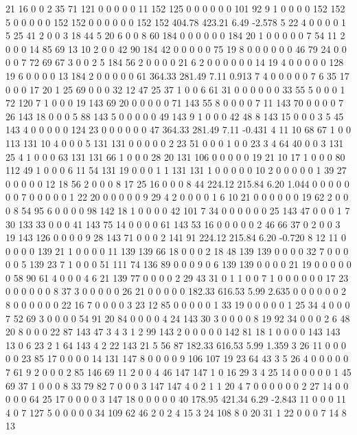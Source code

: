  21 16 0 0 2 35 71 121 0 0 0 0 0 11 152 125 0 0 0 0
 0 0 101 92 9 1 0 0 0 0 152 152 5 0 0 0 0 0 152 152
 0 0 0 0 0 0 152 152
404.78 423.21 6.49 -2.578
 5 22 4 0 0 0 0 1 5 25 41 2 0 0 3 18 44 5 20 6
 0 0 8 60 184 0 0 0 0 0 0 184 20 1 0 0 0 0 0 7
 54 11 2 0 0 0 14 85 69 13 10 2 0 0 42 90 184 42 0 0
 0 0 0 75 19 8 0 0 0 0 0 0 46 79 24 0 0 0 0 7
 72 69 67 3 0 0 2 5 184 56 2 0 0 0 0 21 6 2 0 0
 0 0 0 0 14 19 4 0 0 0 0 0 128 19 6 0 0 0 0 13
 184 2 0 0 0 0 0 61
364.33 281.49 7.11 0.913
 7 4 0 0 0 0 0 7 6 35 17 0 0 0 17 20 1 25 69 0
 0 0 32 12 47 25 37 1 0 0 6 61 31 0 0 0 0 0 0 33
 55 5 0 0 0 1 72 120 7 1 0 0 0 19 143 69 20 0 0 0
 0 0 71 143 55 8 0 0 0 0 7 11 143 70 0 0 0 0 7 26
 143 18 0 0 0 5 88 143 5 0 0 0 0 0 49 143 9 1 0 0
 0 42 48 8 143 15 0 0 0 3 5 45 143 4 0 0 0 0 0 124
 23 0 0 0 0 0 0 47
364.33 281.49 7.11 -0.431
 4 11 10 68 67 1 0 0 113 131 10 4 0 0 0 5 131 131 0 0
 0 0 0 2 23 51 0 0 0 1 0 0 23 3 4 64 40 0 0 3
 131 25 4 1 0 0 0 63 131 131 66 1 0 0 0 28 20 131 106 0
 0 0 0 0 19 21 10 17 1 0 0 0 80 112 49 1 0 0 0 6
 11 54 131 19 0 0 0 1 1 131 131 1 0 0 0 0 0 10 2 0
 0 0 0 0 1 39 27 0 0 0 0 0 12 18 56 2 0 0 0 8
 17 25 16 0 0 0 8 44
224.12 215.84 6.20 1.044
 0 0 0 0 0 0 0 7 0 0 0 0 0 1 22 20 0 0 0 0
 0 9 29 4 2 0 0 0 0 1 6 10 21 0 0 0 0 0 0 19
 62 2 0 0 0 8 54 95 6 0 0 0 0 98 142 18 1 0 0 0
 0 42 101 7 34 0 0 0 0 0 0 25 143 47 0 0 0 1 7 30
 133 33 0 0 0 41 143 75 14 0 0 0 0 61 143 53 16 0 0 0
 0 0 2 46 66 37 0 2 0 0 3 19 143 126 0 0 0 0 9 28
 143 71 0 0 0 2 141 91
224.12 215.84 6.20 -0.720
 8 12 11 0 0 0 0 0 139 21 1 0 0 0 0 11 139 139 66 18
 0 0 0 2 18 48 139 139 0 0 0 0 32 7 0 0 0 0 0 5
 139 23 7 1 0 0 0 51 111 74 136 89 0 0 0 9 0 6 139 139
 0 0 0 0 21 19 0 0 0 0 0 0 58 90 61 4 0 0 0 4
 6 21 139 77 0 0 0 0 2 29 43 31 0 1 1 0 0 7 1 0
 0 0 0 0 0 17 23 0 0 0 0 0 0 8 37 3 0 0 0 0
 0 26 21 0 0 0 0 0
182.33 616.53 5.99 2.635
 0 0 0 0 0 0 2 8 0 0 0 0 0 0 22 16 7 0 0 0
 0 3 23 12 85 0 0 0 0 0 1 33 19 0 0 0 0 0 1 25
 34 4 0 0 0 7 52 69 3 0 0 0 0 54 91 20 84 0 0 0
 0 4 24 143 30 3 0 0 0 0 8 19 92 34 0 0 0 2 6 48
 20 8 0 0 0 22 87 143 47 3 4 3 1 2 99 143 2 0 0 0
 0 0 142 81 18 1 0 0 0 0 143 143 13 0 6 23 2 1 64 143
 4 2 22 143 21 5 56 87
182.33 616.53 5.99 1.359
 3 26 11 0 0 0 0 0 23 85 17 0 0 0 0 14 131 147 8 0
 0 0 0 9 106 107 19 23 64 43 3 5 26 4 0 0 0 0 0 7
 61 9 2 0 0 0 2 85 146 69 11 2 0 0 4 46 147 147 1 0
 16 29 3 4 25 14 0 0 0 0 0 1 45 69 37 1 0 0 0 8
 33 79 82 7 0 0 0 3 147 147 4 0 2 1 1 20 4 7 0 0
 0 0 0 0 2 27 14 0 0 0 0 0 64 25 17 0 0 0 0 3
 147 18 0 0 0 0 0 40
178.95 421.34 6.29 -2.843
 11 0 0 0 11 4 0 7 127 5 0 0 0 0 0 34 109 62 46 2
 0 2 4 15 3 24 108 8 0 20 31 1 22 0 0 0 7 14 8 13
